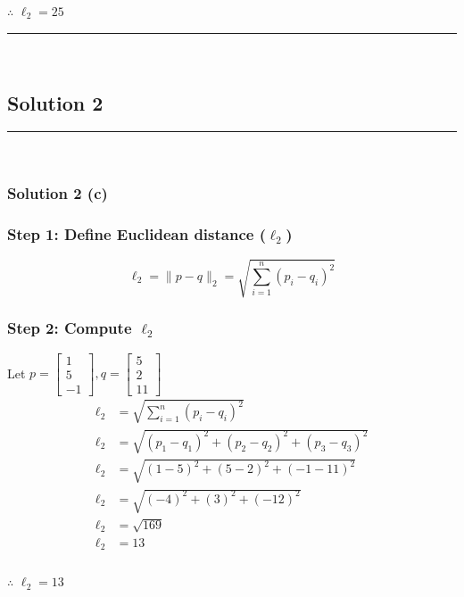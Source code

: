 \documentclass{article}
\begin{document}
\subsubsection*{\normalfont}{$\therefore$ $\ell_{2} = 25$}

\noindent\rule{\textwidth}{0.4pt}\\


\subsection*{Solution 2}
\noindent\rule{\textwidth}{0.4pt}\\
\subsubsection*{Solution 2 (c)}
\subsubsection*{Step 1: Define Euclidean distance ($\ell_2$)}
\parbox{\textwidth}{

$$\ell_2 = \|p - q\|_2 = \sqrt{\sum_{i=1}^{n} (p_i - q_i)^2}$$

}

\subsubsection*{Step 2: Compute $\ell_2$}
\parbox{\textwidth}{
Let $p = \begin{bmatrix} 1 \\ 5 \\ -1 \end{bmatrix}, q = \begin{bmatrix} 5 \\ 2 \\ 11 \end{bmatrix}$
$$
\begin{aligned}
\ell_2 &= \sqrt{\sum_{i=1}^{n} (p_i - q_i)^2}\\
\ell_2 &= \sqrt{(p_1 - q_1)^{2}+(p_2 - q_2)^{2}+(p_3 - q_3)^{2}}\\
\ell_2 &= \sqrt{(1 - 5)^{2}+(5 - 2)^{2}+(-1 - 11)^{2}}\\
\ell_2 &= \sqrt{(-4)^{2}+(3)^{2}+(-12)^{2}}\\
\ell_2 &= \sqrt{169}\\
\ell_2 &= 13
\end{aligned}
$$
}
\subsubsection*{\normalfont}{$\therefore$ $\ell_{2} = 13$}
\end{document}
